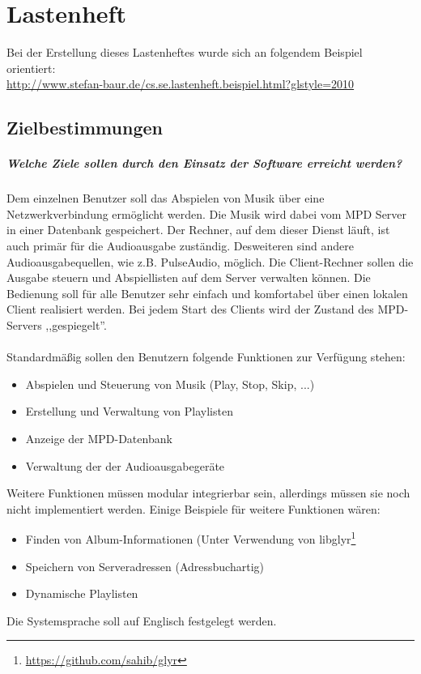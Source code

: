 \chapter{Lastenheft}
Bei der Erstellung dieses Lastenheftes wurde sich an folgendem Beispiel orientiert: \\
\url{http://www.stefan-baur.de/cs.se.lastenheft.beispiel.html?glstyle=2010}
\section{Zielbestimmungen}
\paragraph{Welche Ziele sollen durch den Einsatz der Software erreicht werden?}
Dem einzelnen Benutzer soll das Abspielen von Musik über eine Netzwerkverbindung ermöglicht werden. 
Die Musik wird dabei vom MPD Server in einer Datenbank gespeichert. Der Rechner, auf dem dieser
Dienst läuft, ist auch primär für die Audioausgabe zuständig. Desweiteren sind andere Audioausgabequellen,
wie z.B. PulseAudio, möglich.
Die Client-Rechner sollen die Ausgabe steuern und Abspiellisten auf dem Server verwalten
können. Die Bedienung soll für alle Benutzer sehr einfach und komfortabel über einen lokalen
Client realisiert werden. Bei jedem Start des Clients wird der Zustand des MPD-Servers ,,gespiegelt''.
\\ \\
Standardmäßig sollen den Benutzern folgende Funktionen zur Verfügung stehen:
\renewcommand{\labelitemi}{•}
\begin{itemize}
        \item Abspielen und Steuerung von Musik (Play, Stop, Skip, ...)
        \item Erstellung und Verwaltung von Playlisten
        \item Anzeige der MPD-Datenbank
        \item Verwaltung der der Audioausgabegeräte
\end{itemize}
Weitere Funktionen müssen modular integrierbar sein, allerdings müssen sie noch nicht implementiert
werden. Einige Beispiele für weitere Funktionen wären:
\begin{itemize}
    \item Finden von Album-Informationen (Unter Verwendung von libglyr\footnote{\url{https://github.com/sahib/glyr}}
	\item Speichern von Serveradressen (Adressbuchartig)
	\item Dynamische Playlisten
\end{itemize}
Die Systemsprache soll auf Englisch festgelegt werden.
